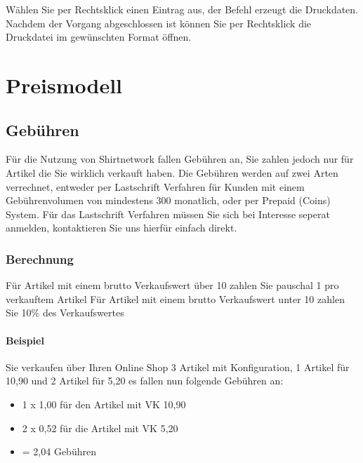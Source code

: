 \documentclass[letterpaper,10pt,ngerman]{sphinxmanual}
\begin{document}
Wählen Sie per Rechtsklick einen Eintrag aus, der Befehl  erzeugt die Druckdaten. Nachdem
der Vorgang abgeschlossen ist können Sie per Rechtsklick  die Druckdatei im gewünschten Format öffnen.


\chapter{Preismodell}
\label{\detokenize{pricing/index:preismodell}}\label{\detokenize{pricing/index::doc}}

\section{Gebühren}
\label{\detokenize{pricing/fees:gebuhren}}\label{\detokenize{pricing/fees::doc}}
Für die Nutzung von Shirtnetwork fallen Gebühren an, Sie zahlen jedoch nur für Artikel die Sie wirklich verkauft haben.
Die Gebühren werden auf zwei Arten verrechnet, entweder per Lastschrift Verfahren für Kunden mit einem Gebührenvolumen von mindestens 300\texteuro{} monatlich, oder per Prepaid (Coins) System.
Für das Lastschrift Verfahren müssen Sie sich bei Interesse seperat anmelden, kontaktieren Sie uns hierfür einfach direkt.



\subsection{Berechnung}
\label{\detokenize{pricing/fees:berechnung}}
Für Artikel mit einem brutto Verkaufswert über 10\texteuro{} zahlen Sie pauschal 1\texteuro{} pro verkauftem Artikel
Für Artikel mit einem brutto Verkaufswert unter 10\texteuro{} zahlen Sie 10\% des Verkaufswertes


\subsubsection{Beispiel}
\label{\detokenize{pricing/fees:beispiel}}
Sie verkaufen über Ihren Online Shop 3 Artikel mit Konfiguration, 1 Artikel für 10,90\texteuro{} und 2 Artikel für 5,20\texteuro{} \sphinxhyphen{} es fallen nun folgende Gebühren an:
\begin{itemize}
\item {} 
1 x 1,00\texteuro{} für den Artikel mit VK 10,90\texteuro{}

\item {} 
2 x 0,52\texteuro{} für die Artikel mit VK 5,20\texteuro{}

\item {} 
= 2,04\texteuro{} Gebühren

\end{itemize}
\end{document}
